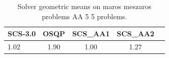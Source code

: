 \begin{table}
\centering
\caption{Solver geometric means on maros meszaros problems AA 5 5 problems.}
\label{t-maros meszaros problems AA 5 5-geom_mean}
\begin{tabular}{lcccc}
\toprule
 SCS-3.0 &  OSQP &  SCS\_AA1 &  SCS\_AA2 \\
\midrule
    1.02 &  1.90 &     1.00 &     1.27 \\
\bottomrule
\end{tabular}
\end{table}
